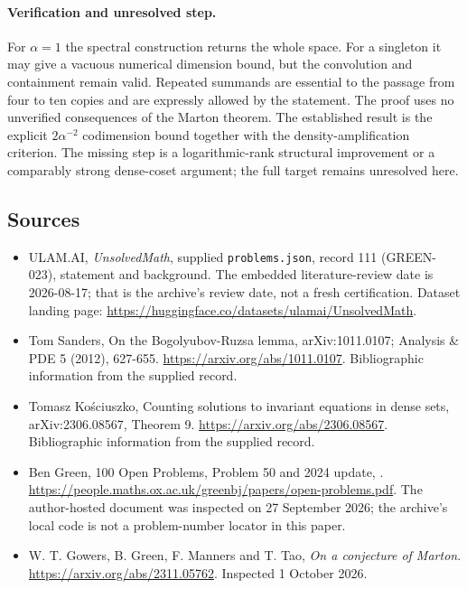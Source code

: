 \documentclass[11pt,a4paper]{article}
\begin{document}
\paragraph{Verification and unresolved step.}
For $\alpha=1$ the spectral construction returns the whole space. For a singleton it may give a vacuous numerical dimension bound, but the convolution and containment remain valid. Repeated summands are essential to the passage from four to ten copies and are expressly allowed by the statement. The proof uses no unverified consequences of the Marton theorem. The established result is the explicit $2\alpha^{-2}$ codimension bound together with the density-amplification criterion. The missing step is a logarithmic-rank structural improvement or a comparably strong dense-coset argument; the full target remains unresolved here.

\subsection{Sources}

{\small

\begin{itemize}

\item[\hypertarget{source:111:1}{S1}] ULAM.AI, \emph{UnsolvedMath}, supplied \texttt{problems.json}, record 111 (GREEN-023), statement and background. The embedded literature-review date is 2026-08-17; that is the archive’s review date, not a fresh certification. Dataset landing page: \url{https://huggingface.co/datasets/ulamai/UnsolvedMath}.

\item[\hypertarget{source:111:2}{S2}] Tom Sanders, On the Bogolyubov-Ruzsa lemma, arXiv:1011.0107; Analysis \& PDE 5 (2012), 627-655. \url{https://arxiv.org/abs/1011.0107}. Bibliographic information from the supplied record.

\item[\hypertarget{source:111:3}{S3}] Tomasz Kościuszko, Counting solutions to invariant equations in dense sets, arXiv:2306.08567, Theorem 9. \url{https://arxiv.org/abs/2306.08567}. Bibliographic information from the supplied record.

\item[\hypertarget{source:111:4}{S4}] Ben Green, 100 Open Problems, Problem 50 and 2024 update, . \url{https://people.maths.ox.ac.uk/greenbj/papers/open-problems.pdf}. The author-hosted document was inspected on 27 September 2026; the archive’s local code is not a problem-number locator in this paper.

\item[E1] W. T. Gowers, B. Green, F. Manners and T. Tao, \emph{On a conjecture of Marton}. \url{https://arxiv.org/abs/2311.05762}. Inspected 1 October 2026.

\end{itemize}

}

\label{end:111}
\end{document}

